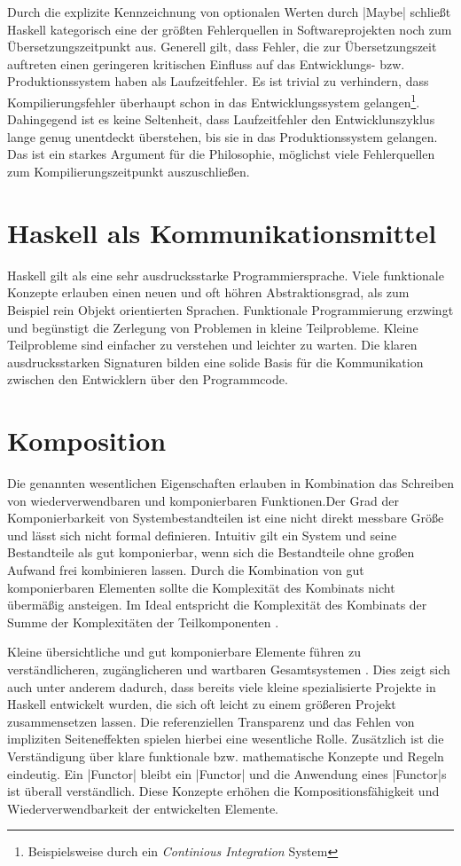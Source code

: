 Durch die explizite Kennzeichnung von optionalen Werten durch |Maybe| schließt Haskell kategorisch eine der größten Fehlerquellen in Softwareprojekten noch zum Übersetzungszeitpunkt aus. Generell gilt, dass Fehler, die zur Übersetzungszeit auftreten einen geringeren kritischen Einfluss auf das Entwicklungs- bzw. Produktionssystem haben als Laufzeitfehler. Es ist trivial zu verhindern, dass Kompilierungsfehler überhaupt schon in das Entwicklungssystem gelangen\footnote{Beispielsweise durch ein \textit{Continious Integration} System}. Dahingegend ist es keine Seltenheit, dass Laufzeitfehler den Entwicklunszyklus lange genug unentdeckt überstehen, bis sie in das Produktionssystem gelangen. Das ist ein starkes Argument für die Philosophie, möglichst viele Fehlerquellen zum Kompilierungszeitpunkt auszuschließen.

\section{Haskell als Kommunikationsmittel}

Haskell gilt als eine sehr ausdrucksstarke Programmiersprache. Viele funktionale Konzepte erlauben einen neuen und oft höhren Abstraktionsgrad, als zum Beispiel rein Objekt orientierten Sprachen. Funktionale Programmierung erzwingt und begünstigt die Zerlegung von Problemen in kleine Teilprobleme. Kleine Teilprobleme sind einfacher zu verstehen und leichter zu warten. Die klaren ausdrucksstarken Signaturen bilden eine solide Basis für die Kommunikation zwischen den Entwicklern über den Programmcode. 

\section{Komposition}

Die genannten wesentlichen Eigenschaften erlauben in Kombination das Schreiben von wiederverwendbaren und komponierbaren Funktionen.Der Grad der Komponierbarkeit von Systembestandteilen ist eine nicht direkt messbare Größe und lässt sich nicht formal definieren. Intuitiv gilt ein System und seine Bestandteile als gut komponierbar, wenn sich die Bestandteile ohne großen Aufwand frei kombinieren lassen. Durch die Kombination von gut komponierbaren Elementen sollte die Komplexität des Kombinats nicht übermäßig ansteigen. Im Ideal entspricht die Komplexität des Kombinats der Summe der Komplexitäten der Teilkomponenten \parencite[Seite 19]{Blackheath2013}.

Kleine übersichtliche und gut komponierbare Elemente führen zu verständlicheren, zugänglicheren und wartbaren Gesamtsystemen \parencite[Seite 12 ff.]{Stewart2015}. Dies zeigt sich auch unter anderem dadurch, dass bereits viele kleine spezialisierte Projekte in Haskell entwickelt wurden, die sich oft leicht zu einem größeren Projekt zusammensetzen lassen. Die referenziellen Transparenz und das Fehlen von impliziten Seiteneffekten spielen hierbei eine wesentliche Rolle. Zusätzlich ist die Verständigung über klare funktionale bzw. mathematische Konzepte und Regeln eindeutig. Ein |Functor| bleibt ein |Functor| und die Anwendung eines |Functor|s ist überall verständlich. Diese Konzepte erhöhen die Kompositionsfähigkeit und Wiederverwendbarkeit der entwickelten Elemente.

